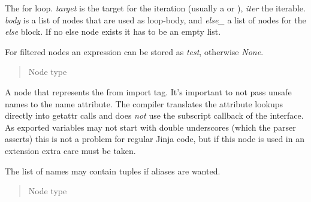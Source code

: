 \documentclass[a4paper,10pt,english]{sphinxmanual}
\begin{document}

\begin{fulllineitems}
\label{extensions:jinja2.nodes.For}
The for loop.  \emph{target} is the target for the iteration (usually a
{\hyperref[extensions:jinja2.nodes.Name]{}} or {\hyperref[extensions:jinja2.nodes.Tuple]{}}), \emph{iter} the iterable.  \emph{body} is a list
of nodes that are used as loop-body, and \emph{else\_} a list of nodes for the
\emph{else} block.  If no else node exists it has to be an empty list.

For filtered nodes an expression can be stored as \emph{test}, otherwise \emph{None}.
\begin{quote}\begin{description}
\item[{Node type}] \leavevmode
{\hyperref[extensions:jinja2.nodes.Stmt]{}}

\end{description}\end{quote}

\end{fulllineitems}


\begin{fulllineitems}
\label{extensions:jinja2.nodes.FromImport}
A node that represents the from import tag.  It's important to not
pass unsafe names to the name attribute.  The compiler translates the
attribute lookups directly into getattr calls and does \emph{not} use the
subscript callback of the interface.  As exported variables may not
start with double underscores (which the parser asserts) this is not a
problem for regular Jinja code, but if this node is used in an extension
extra care must be taken.

The list of names may contain tuples if aliases are wanted.
\begin{quote}\begin{description}
\item[{Node type}] \leavevmode
{\hyperref[extensions:jinja2.nodes.Stmt]{}}

\end{description}\end{quote}

\end{fulllineitems}
\end{document}
